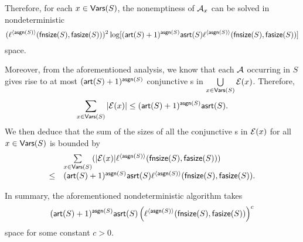 Therefore, for each $x \in \mathsf{Vars}(S)$, 
the nonemptiness of $\mathcal{A}_x$ can be solved in nondeterministic 
{\small
$$
    (\ell^{\langle \mathsf{asgn}(S) \rangle}(\mathsf{fnsize}(S), \mathsf{fasize}(S)))^2 
    \log[(\mathsf{art}(S)+1)^{\mathsf{asgn}(S)}\mathsf{asrt}(S)
    \ell^{\langle \mathsf{asgn}(S) \rangle}(\mathsf{fnsize}(S), \mathsf{fasize}(S))]$$
}
space.

Moreover, from the aforementioned analysis, we know that each \FA{} $\mathcal{A}$ occurring in $S$ gives rise to at most $(\mathsf{art}(S)+1)^{\mathsf{asgn}(S)}$ conjunctive \FA{}s in $\bigcup \limits_{x \in \mathsf{Vars}(S)} \mathcal{E}(x)$. Therefore, 
$$\sum \limits_{x \in \mathsf{Vars}(S)} |\mathcal{E}(x)| \le (\mathsf{art}(S)+1)^{\mathsf{asgn}(S)} \mathsf{asrt}(S).$$
We then deduce that the sum of the sizes of all the conjunctive \FA{}s in
    $\mathcal{E}(x)$ for all $x \in \mathsf{Vars}(S)$ is bounded by 
$$
\begin{array}{l l}
& \sum \limits_{x \in \mathsf{Vars}(S)} (|\mathcal{E}(x)| \ell^{\langle \mathsf{asgn}(S) \rangle}(\mathsf{fnsize}(S), \mathsf{fasize}(S)))  \\
\le & (\mathsf{art}(S)+1)^{\mathsf{asgn}(S)}\mathsf{asrt}(S) \ell^{\langle \mathsf{asgn}(S) \rangle}(\mathsf{fnsize}(S), \mathsf{fasize}(S)) .
\end{array}
$$

In summary, the aforementioned nondeterministic algorithm takes 
$$(\mathsf{art}(S)+1)^{\mathsf{asgn}(S)}  \mathsf{asrt}(S) \left(\ell^{\langle \mathsf{asgn}(S) \rangle}(\mathsf{fnsize}(S), \mathsf{fasize}(S)) \right)^c$$
 space for some constant $c > 0$.
